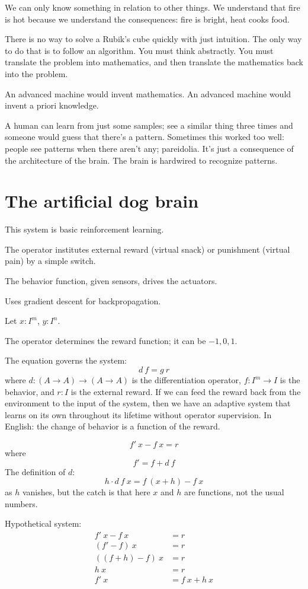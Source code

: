 We can only know something in relation to other things.
We understand that fire is hot because we understand the consequences:
fire is bright, heat cooks food.

There is no way to solve a Rubik's cube quickly with just intuition.
The only way to do that is to follow an algorithm.
You must think abstractly.
You must translate the problem into mathematics,
and then translate the mathematics back into the problem.

An advanced machine would invent mathematics.
An advanced machine would invent a priori knowledge.

A human can learn from just some samples;
see a similar thing three times and someone would guess that there's a pattern.
Sometimes this worked too well: people see patterns when there aren't any;
pareidolia.
It's just a consequence of the architecture of the brain.
The brain is hardwired to recognize patterns.

\section{The artificial dog brain}

This system is basic reinforcement learning.

The operator institutes external reward
(virtual snack) or punishment (virtual pain)
by a simple switch.

The behavior function, given sensors, drives the actuators.

Uses gradient descent for backpropagation.

Let \( x : I^m \), \( y : I^n \).

The operator determines the reward function;
it can be \(-1,0,1\).

The equation governs the system:
\[
    d~f = g~r
\]
where \(d : (A \to A) \to (A \to A)\) is the differentiation operator,
\( f : I^m \to I \) is the behavior,
and \( r : I \) is the external reward.
If we can feed the reward back from
the environment to the input of the system,
then we have an adaptive system that
learns on its own throughout its lifetime without operator supervision.
In English: the change of behavior is a function of the reward.

\[
    f'~x - f~x = r
\]
where
\[
    f' = f + d~f
\]
The definition of \(d\):
\[
    h \cdot d~f~x = f~(x+h) - f~x
\]
as \(h\) vanishes,
but the catch is that
here \(x\) and \(h\) are functions, not the usual numbers.

Hypothetical system:
\begin{align*}
    f'~x - f~x &= r
    \\
    (f' - f)~x &= r
    \\
    ((f + h) - f)~x &= r
    \\
    h~x &= r
    \\
    f'~x &= f~x + h~x
\end{align*}

